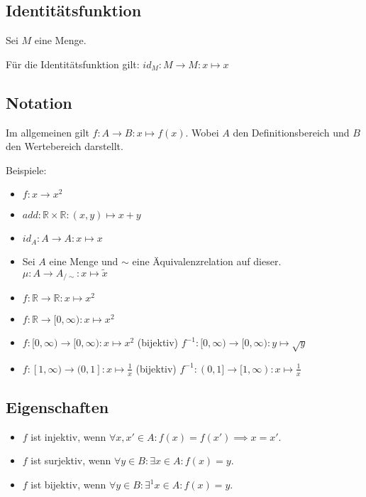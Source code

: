 \documentclass[12pt]{scrreprt}
\begin{document}
            \subsection{Identitätsfunktion}
                Sei $ M $ eine Menge.

                Für die Identitätsfunktion gilt: $ id _ M : M \rightarrow M : x \mapsto x $


            \subsection{Notation}
                Im allgemeinen gilt $ f : A \rightarrow B : x \mapsto f(x) $. Wobei $ A $ den Definitionsbereich und $ B $ den Wertebereich darstellt.

                Beispiele:
                \begin{itemize}
                    \item $ f : x \rightarrow x ^ 2 $
                    \item $ add : \mathbb{R} \times \mathbb{R} : (x, y) \mapsto x + y $
                    \item $ id _ A : A \rightarrow A : x \mapsto x $
                    \item Sei $ A $ eine Menge und $ \sim $ eine Äquivalenzrelation auf dieser. $ \mu : A \rightarrow A _ { /\sim } : x \mapsto \tilde{x} $
                    \item $ f : \mathbb{R} \rightarrow \mathbb{R} : x \mapsto x ^ 2 $
                    \item $ f : \mathbb{R} \rightarrow [0, \infty) : x \mapsto x ^ 2 $
                    \item $ f : [0, \infty) \rightarrow [0, \infty) : x \mapsto x ^ 2 $ (bijektiv) $ f ^ { -1 } : [0, \infty) \rightarrow [0, \infty) : y \mapsto \sqrt{y} $
                    \item $ f : [1, \infty) \rightarrow (0, 1] : x \mapsto \frac{1}{x} $ (bijektiv) $ f ^ { -1 } : (0, 1] \rightarrow [1, \infty) : x \mapsto \frac{1}{x} $
                \end{itemize}


            \subsection{Eigenschaften}
                \begin{itemize}
                    \item $ f $ ist injektiv, wenn $ \forall x, x' \in A : f(x) = f(x') \implies x = x' $.
                    \item $ f $ ist surjektiv, wenn $ \forall y \in B : \exists x \in A : f(x) = y $.
                    \item $ f $ ist bijektiv, wenn $ \forall y \in B : \exists ^ 1 x \in A : f(x) = y $.
                \end{itemize}
\end{document}
